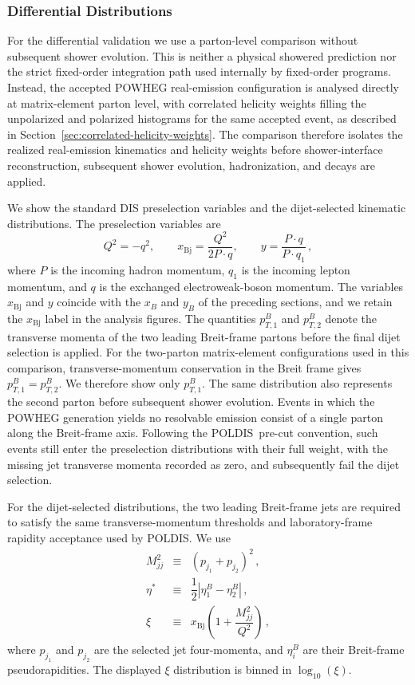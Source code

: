 \documentclass[a4paper,11pt]{article}
\newcommand{\POLDIS}{\textsc{POLDIS}}
\begin{document}
\subsubsection{Differential Distributions}
For the differential validation we use a parton-level comparison without
subsequent shower evolution. This is neither a physical showered prediction nor
the strict fixed-order integration path used internally by fixed-order programs.
Instead, the accepted POWHEG real-emission configuration is analysed directly at
matrix-element parton level, with correlated helicity weights filling the
unpolarized and polarized histograms for the same accepted event, as described
in Section~\ref{sec:correlated-helicity-weights}. The comparison therefore
isolates the realized real-emission kinematics and helicity weights before
shower-interface reconstruction, subsequent shower evolution, hadronization, and
decays are applied.

We show the standard DIS preselection variables and the dijet-selected
kinematic distributions. The preselection variables are
\begin{equation}
  Q^2=-q^2,\qquad
  x_{\mathrm{Bj}}=\frac{Q^2}{2P\cdot q},\qquad
  y=\frac{P\cdot q}{P\cdot q_1}\,,
\end{equation}
where $P$ is the incoming hadron momentum, $q_1$ is the incoming lepton momentum,
and $q$ is the exchanged electroweak-boson momentum. The variables
$x_{\mathrm{Bj}}$ and $y$ coincide with the $x_B$ and $y_B$ of the preceding
sections, and we retain the $x_{\mathrm{Bj}}$ label in the analysis figures. The quantities
$p_{T,1}^{B}$ and $p_{T,2}^{B}$ denote the transverse momenta of the two
leading Breit-frame partons before the final dijet selection is applied.
For the two-parton matrix-element configurations used in this comparison,
transverse-momentum conservation in the Breit frame gives
$p_{T,1}^{B}=p_{T,2}^{B}$. We therefore show only $p_{T,1}^{B}$. The same
distribution also represents the second parton before subsequent shower
evolution. Events in which the POWHEG generation yields no resolvable
emission consist of a single parton along the Breit-frame axis. Following the
\POLDIS\ pre-cut convention, such events still enter the preselection
distributions with their full weight, with the missing jet transverse momenta
recorded as zero, and subsequently fail the dijet selection.

For the dijet-selected distributions, the two leading Breit-frame jets are
required to satisfy the same transverse-momentum thresholds and
laboratory-frame rapidity acceptance used by \POLDIS. We use
\begin{equation}
\begin{array}{rcl}
M_{jj}^2 &\equiv& (p_{j_1}+p_{j_2})^2\,, \\[2mm]
\eta^\ast &\equiv& \dfrac{1}{2}\left|\eta_1^B-\eta_2^B\right|\,, \\[2mm]
\xi &\equiv& x_{\mathrm{Bj}}\left(1+\dfrac{M_{jj}^2}{Q^2}\right)\,,
\end{array}
\end{equation}
where $p_{j_1}$ and $p_{j_2}$ are the selected jet four-momenta, and
$\eta_i^B$ are their Breit-frame pseudorapidities. The displayed $\xi$
distribution is binned in $\log_{10}(\xi)$.
\end{document}
